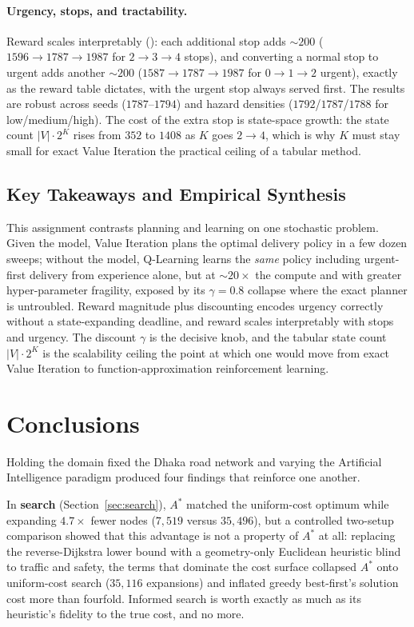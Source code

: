 \documentclass{ai-lab-report}
\begin{document}
\paragraph{Urgency, stops, and tractability.}
Reward scales interpretably (): each additional stop adds ${\sim}200$ ($1596\to1787\to1987$ for $2\to3\to4$ stops), and converting a normal stop to urgent adds another ${\sim}200$ ($1587\to1787\to1987$ for $0\to1\to2$ urgent), exactly as the reward table dictates, with the urgent stop always served first. The results are robust across seeds ($1787$--$1794$) and hazard densities ($1792$/$1787$/$1788$ for low/medium/high). The cost of the extra stop is state-space growth: the state count $|V|\cdot2^{K}$ rises from $352$ to $1408$ as $K$ goes $2\to4$, which is why $K$ must stay small for exact Value Iteration the practical ceiling of a tabular method.

\subsection{Key Takeaways and Empirical Synthesis}
This assignment contrasts planning and learning on one stochastic problem. Given the model, Value Iteration plans the optimal delivery policy in a few dozen sweeps; without the model, Q-Learning learns the \emph{same} policy including urgent-first delivery from experience alone, but at ${\sim}20\times$ the compute and with greater hyper-parameter fragility, exposed by its $\gamma{=}0.8$ collapse where the exact planner is untroubled. Reward magnitude plus discounting encodes urgency correctly without a state-expanding deadline, and reward scales interpretably with stops and urgency. The discount $\gamma$ is the decisive knob, and the tabular state count $|V|\cdot2^{K}$ is the scalability ceiling the point at which one would move from exact Value Iteration to function-approximation reinforcement learning.

\section{Conclusions}
\label{sec:conclusion}
Holding the domain fixed  the Dhaka road network  and varying the
Artificial Intelligence paradigm produced four findings that
reinforce one another.

In \textbf{search} (Section~\ref{sec:search}), $A^{*}$ matched the
uniform-cost optimum while expanding $4.7\times$ fewer nodes
($7{,}519$ versus $35{,}496$), but a controlled two-setup
comparison showed that this advantage is not a property of $A^{*}$
at all: replacing the reverse-Dijkstra lower bound with a
geometry-only Euclidean heuristic  blind to traffic and safety,
the terms that dominate the cost surface  collapsed $A^{*}$ onto
uniform-cost search ($35{,}116$ expansions) and inflated greedy
best-first's solution cost more than fourfold. Informed search is
worth exactly as much as its heuristic's fidelity to the true cost,
and no more.
\end{document}
